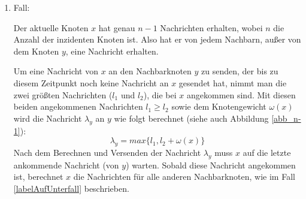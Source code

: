 \begin{enumerate}
		
	
			
	\item Fall:\label{algo_fall_2}
	
		
		Der aktuelle Knoten $x$ hat genau $n-1$ Nachrichten erhalten, wobei $n$ die Anzahl der inzidenten Knoten ist. Also hat er von jedem Nachbarn, außer von dem Knoten $y$, eine Nachricht erhalten.
		
	
		
		Um eine Nachricht von $x$ an den Nachbarknoten $y$ zu senden, der bis zu diesem Zeitpunkt noch keine Nachricht an $x$ gesendet hat, nimmt man die zwei größten Nachrichten ($l_{1}$ und $l_{2}$), die bei $x$ angekommen sind. Mit diesen beiden angekommenen Nachrichten $l_{1} \ge l_{2}$ sowie dem Knotengewicht $\omega(x)$ wird die Nachricht $\lambda_{y}$ an $y$ wie folgt berechnet (siehe auch Abbildung \ref{abb_n-1}): $$\lambda_{y} = max\{l_{1},  l_{2} + \omega(x)\}$$
		Nach dem Berechnen und Versenden der Nachricht $\lambda_{y}$ muss $x$ auf die letzte ankommende Nachricht (von $y$) warten. Sobald diese Nachricht angekommen ist, berechnet $x$ die Nachrichten für alle anderen Nachbarknoten, wie im Fall \ref{labelAufUnterfall} beschrieben. 
		
		
		
		

\end{enumerate}
